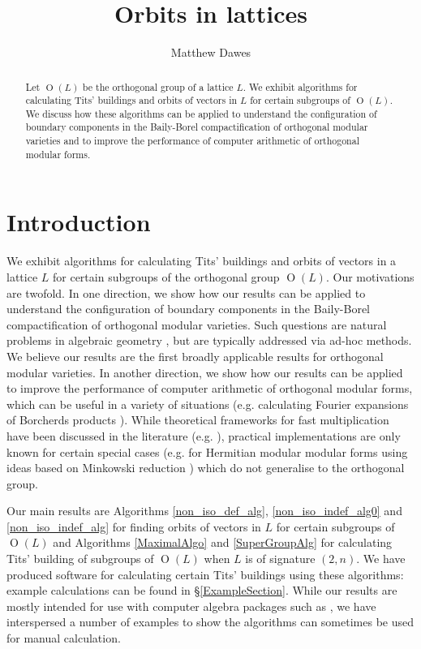 \documentclass[12pt, a4paper]{article}
\title{Orbits in lattices}
\author{Matthew Dawes}
\date{}
\newcommand{\opn}{\operatorname}
\begin{document}
\maketitle
\begin{abstract}
  Let $\opn{O}(L)$ be the orthogonal group of a lattice $L$.
  We exhibit algorithms for calculating Tits' buildings and orbits of vectors in $L$ for certain subgroups of $\opn{O}(L)$.
  We discuss how these algorithms can be applied
  to understand the configuration of boundary components in the Baily-Borel compactification of orthogonal modular varieties
  and to improve the performance of computer arithmetic of orthogonal modular forms.
\end{abstract}
\section{Introduction}
We exhibit algorithms for calculating Tits' buildings and orbits of vectors in a lattice $L$ for certain subgroups of the orthogonal group $\opn{O}(L)$.
Our motivations are twofold.
In one direction, we show how our results can be applied to understand the configuration of boundary components in the Baily-Borel compactification of orthogonal modular varieties.
Such questions are natural problems in algebraic geometry \cite{DawesFamily, abeliancompact, Scattone, Sterk}, but are typically addressed via ad-hoc methods.
We believe our results are the first broadly applicable results for orthogonal modular varieties.
In another direction, we show how our results can be applied to improve the performance of computer arithmetic of orthogonal modular forms, which can be useful in a variety of situations (e.g. calculating Fourier expansions of Borcherds products \cite{GKRBorcherdsproducts}).
While theoretical frameworks for fast multiplication have been discussed in the literature (e.g. \cite{RaumImplement}), practical implementations are only known for  certain special cases (e.g. for Hermitian modular modular forms using ideas based on Minkowski reduction \cite{DernThesis}) which do not generalise to the orthogonal group.

Our main results are Algorithms \ref{non_iso_def_alg}, \ref{non_iso_indef_alg0} and \ref{non_iso_indef_alg} for finding orbits of vectors in $L$ for certain subgroups of $\opn{O}(L)$ and Algorithms \ref{MaximalAlgo} and \ref{SuperGroupAlg} for calculating Tits' building of subgroups of $\opn{O}(L)$ when $L$ is of signature $(2,n)$.
We have produced software \cite{boundary} for calculating certain Tits' buildings using these algorithms: example calculations can be found in \S\ref{ExampleSection}.  
While our results are mostly intended for use with computer algebra packages such as \cite{GAP, SAGE, MAGMA}, we have interspersed a number of examples to show the algorithms can sometimes be used for manual calculation.
\end{document}
